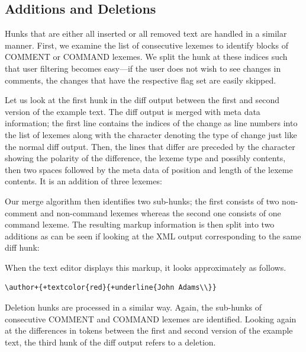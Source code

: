 \subsection{Additions and Deletions}

Hunks that are either all inserted or all removed text are handled in a similar manner.  First, we examine the list of consecutive lexemes to identify blocks of COMMENT or COMMAND lexemes.  We split the hunk at these indices such that user filtering becomes easy---if the user does not wish to see changes in comments, the changes that have the respective flag set are easily skipped.

Let us look at the first hunk in the diff output between the first and second version of the example text.  The diff output is merged with meta data information; the first line contains the indices of the change as line numbers into the list of lexemes along with the character denoting the type of change just like the normal diff output.  Then, the lines that differ are preceded by the character showing the polarity of the difference, the lexeme type and possibly contents, then two spaces followed by the meta data of position and length of the lexeme contents.  It is an addition of three lexemes:


Our merge algorithm then identifies two sub-hunks; the first consists of two non-comment and non-command lexemes whereas the second one consists of one command lexeme.  The resulting markup information is then split into two additions as can be seen if looking at the XML output corresponding to the same diff hunk:


When the text editor displays this markup, it looks approximately as follows.

\begin{Verbatim}[frame=lines,label={Markup for first diff block in text editor},samepage=true,showspaces=true,commandchars=+\{\}]
\author+{+textcolor{red}{+underline{John Adams\\}}
\end{Verbatim}

Deletion hunks are processed in a similar way.  Again, the sub-hunks of consecutive COMMENT and COMMAND lexemes are identified.  Looking again at the differences in tokens between the first and second version of the example text, the third hunk of the diff output refers to a deletion.

